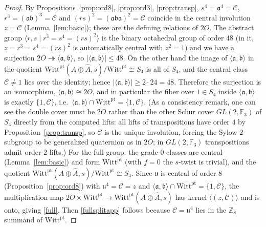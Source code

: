\documentclass[aps,twocolumn,prx,floatfix,preprintnumbers, nofootinbib,10pt]{revtex4-2}
\numberwithin{equation}{section}
\theoremstyle{definition}
\theoremstyle{remark}
\theoremstyle{claim}
\newcommand{\Perm}{S}
\newcommand{\ga}{\mathfrak{a}}
\newcommand{\gb}{\mathfrak{b}}
\newcommand{\gu}{\mathfrak{u}}
\newcommand{\Z}{{\mathbb Z}}
\newcommand{\cC}{\mathcal{C}}
\newcommand{\Witt}{\text{Witt}}
\newcommand{\pt}{\text{pt}}
\begin{document}
\begin{proof}
By Propositions~\ref{prop:ord8}, \ref{prop:ord3}, \ref{prop:transp},
$s^4=\ga^4=\cC$, $r^3=(\ga\gb)^3=\cC$ and $(rs)^2=(\ga\gb\ga)^2=\cC$ coincide in the central
involution $z=\cC$ (Lemma~\ref{lem:basic}); these are the defining relations of $2O$.
The abstract group $\langle r,s\mid r^3=s^4=(rs)^2\rangle$ is the binary octahedral group of order $48$
(in it, $z=r^3=s^4=(rs)^2$ is automatically central with $z^2=1$) and we have a surjection $2O\twoheadrightarrow\langle\ga,\gb\rangle$, so
$|\langle\ga,\gb\rangle|\le 48$.  On the other hand the image of
$\langle\ga,\gb\rangle$ in the quotient $\Witt^\pt(A\oplus\widehat A,s)/\Witt^\pt\cong \Perm_4$ is all of
$\Perm_4$, and the central class $\cC\neq1$ lies over the identity; hence
$|\langle\ga,\gb\rangle|\ge 2\cdot 24=48$.  Therefore the surjection is an isomorphism,
$\langle\ga,\gb\rangle\cong 2O$, and in particular the fiber over $1\in \Perm_4$ inside
$\langle\ga,\gb\rangle$ is exactly $\{1,\cC\}$, i.e.\
$\langle\ga,\gb\rangle\cap\Witt^\pt=\{1,\cC\}$.
(As a consistency remark, one can see the double cover must be $2O$ rather than
the other Schur cover $GL(2,\mathbb F_3)$ of $\Perm_4$ directly from the computed lifts: all
lifts of transpositions have order $4$ by Proposition~\ref{prop:transp}, so $\cC$ is the
unique involution, forcing the Sylow $2$-subgroup to be generalized quaternion as in $2O$;
in $GL(2,\mathbb F_3)$ transpositions admit order-$2$ lifts.)
For the full group: the grade-$0$ classes are central (Lemma~\ref{lem:basic}) and form $\Witt^\pt$
(with $f=0$ the $s$-twist is trivial), and the quotient $\Witt^\pt(A\oplus\widehat A,s)/\Witt^\pt\cong \Perm_4$. Since $\gu$ is central of order $8$
(Proposition~\ref{prop:ord8}) with $\gu^4=\cC=z$ and $\langle\ga,\gb\rangle\cap\Witt^\pt=\{1,\cC\}$, the
multiplication map $2O\times\Witt^\pt\to\Witt^\pt(A\oplus\widehat A,s)$ has kernel $\langle(z,\cC)\rangle$ and is onto,
giving \eqref{full}. Then \eqref{fullsplitapp} follows
because $\cC=\gu^4$ lies in the $\Z_8$ summand of $\Witt^\pt$.
\end{proof}
\end{document}
